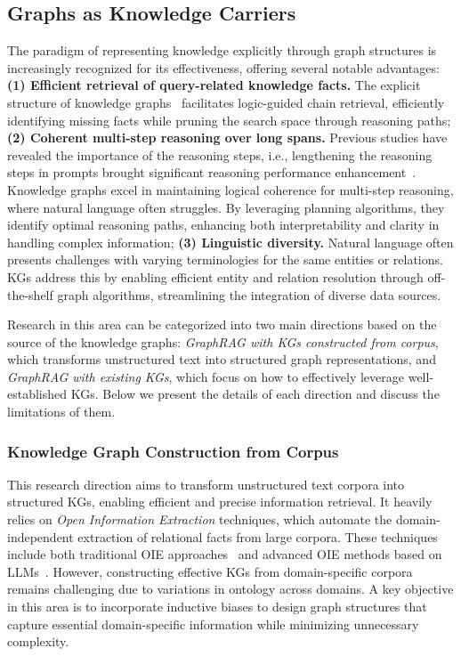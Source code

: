 \documentclass[lettersize,journal]{IEEEtran}
\begin{document}
\subsection{Graphs as Knowledge Carriers}
The paradigm of representing knowledge explicitly through graph structures is increasingly recognized for its effectiveness, offering several notable advantages: \textbf{(1) Efficient retrieval of query-related knowledge facts.} The explicit structure of knowledge graphs~\cite{pan2024unifying} facilitates logic-guided chain retrieval, efficiently identifying missing facts while pruning the search space through reasoning paths; \textbf{(2) Coherent multi-step reasoning over long spans.} Previous studies have revealed the importance of the reasoning steps, i.e., lengthening the reasoning steps in prompts brought significant reasoning performance enhancement~\cite{jin-etal-2024-impact}. Knowledge graphs excel in maintaining logical coherence for multi-step reasoning, where natural language often struggles. By leveraging planning algorithms, they identify optimal reasoning paths, enhancing both interpretability and clarity in handling complex information; \textbf{(3) Linguistic diversity.} Natural language often presents challenges with varying terminologies for the same entities or relations. KGs address this by enabling efficient entity and relation resolution through off-the-shelf graph algorithms, streamlining the integration of diverse data sources.

Research in this area can be categorized into two main directions based on the source of the knowledge graphs: \textit{GraphRAG with KGs constructed from corpus}, which transforms unstructured text into structured graph representations, and \textit{GraphRAG with existing KGs}, which focus on how to effectively leverage well-established KGs. Below we present the details of each direction and discuss the limitations of them.

\subsubsection{Knowledge Graph Construction from Corpus}
This research direction aims to transform unstructured text corpora into structured KGs, enabling efficient and precise information retrieval. It heavily relies on \textit{Open Information Extraction} techniques, which automate the domain-independent extraction of relational facts from large corpora. These techniques include both traditional OIE approaches~\cite{yates2007textrunner, angeli2015standfordoie,li2022constructing,kolluru2020openie6}
and advanced OIE methods based on LLMs~\cite{cohen2023crawling,chen2024sac-kg}. However, constructing effective KGs from domain-specific corpora remains challenging due to variations in ontology across domains. A key objective in this area is to incorporate inductive biases to design graph structures that capture essential domain-specific information while minimizing unnecessary complexity.
\end{document}
